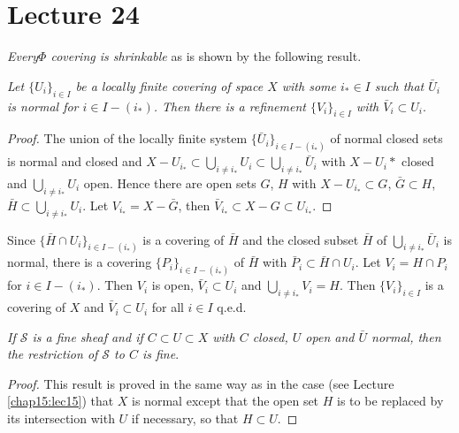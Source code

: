 \chapter{Lecture 24}\label{chap24:lec24}%

\textit{Every\pageoriginale $\Phi$ covering is shrinkable} as is shown
by the following result. 

\textit{Let $\{U_i \}_{i \in I}$  be a locally finite covering of space
  $X$ with some $i_* \in I$ such that $\bar{U}_i$ is normal for $i \in
  I-(i_*)$. Then there is a refinement $\{ V_i \}_{i \in I}$ with
  $\bar{V}_i \subset U_i$}. 

\begin{proof}
The union of the locally finite system $\{\bar{U}_i\}_{i \in I
  -(i_*)}$ of normal closed sets is normal and closed and $X-U_{i_\ast}
\subset \bigcup\limits_{i\neq i_\ast} U_i \subset \bigcup\limits_{i
  \neq i_\ast}\bar{U}_i$
with $X -U_i*$ closed and $\bigcup\limits_{i \neq i_\ast}{U}_i$
open. Hence there are open sets $G$, $H$ with $X-U_{i_\ast} \subset G$, $\bar{G}
\subset H$, $\bar{H} \subset \bigcup\limits_{i \neq i_\ast} U_i$. Let
$V_{i_*}=X - \bar{G}$, then $\bar{V}_{i_*} \subset X- G \subset
U_{i_*}$. 
\end{proof}

Since $\{\bar{H} \cap U_i \}_{i \in I -(i_*)}$ is a covering of
$\bar{H}$ and the closed subset $\bar{H}$ of $\bigcup\limits_{i \neq
  i_{\ast}} \bar{U}_i$ is normal, there is a covering $\{ P_i \}_{i
  \in I-(i_{\ast})}$ 
of $\bar{H}$ with $\bar{P}_i \subset \bar{H} \cap U_i$. Let $V_i = H
\cap P_i$ for $i \in I - (i_*)$. Then $V_i$ is open, $\bar{V}_i
\subset U_i$ and $\bigcup\limits_{i \neq i_*} V_i =H$. Then $\{ V_i \}_{i
\in I}$ is a covering of $X$ and $\bar{V}_i \subset U_i$ for all $i
\in I$ q.e.d.  

\textit{If $\mathscr{S}$ is a fine sheaf and if $C \subset U \subset
  X$ with $C$ closed, $U$ open and $\bar{U}$ normal, then the
  restriction of $ \mathscr{S}$ to $C$ is fine}. 

\begin{proof}
This result is proved in the same way as in the case (see Lecture
\ref{chap15:lec15}) 
that $X$ is normal except that the open set $H$ is to be 
replaced by its intersection with $U$ if necessary, so that $H \subset
U$. 
\end{proof}

